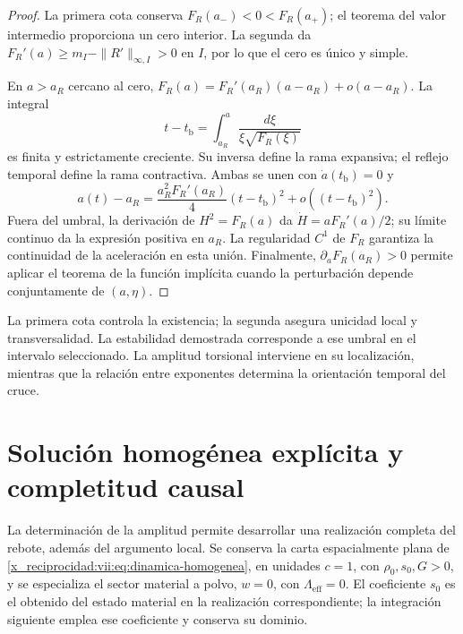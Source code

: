 \begin{proof}
La primera cota conserva
\(F_R(a_-)<0<F_R(a_+)\); el teorema del valor intermedio proporciona
un cero interior. La segunda da
\(F_R'(a)\geq m_I-\|R'\|_{\infty,I}>0\) en \(I\), por lo que el cero
es único y simple.

En \(a>a_R\) cercano al cero,
\(F_R(a)=F_R'(a_R)(a-a_R)+o(a-a_R)\).
La integral
\[
 t-t_{\mathrm b}=\int_{a_R}^{a}
          \frac{d\xi}{\xi\sqrt{F_R(\xi)}}
\]
es finita y estrictamente creciente. Su inversa define la rama
expansiva; el reflejo temporal define la rama contractiva.
Ambas se unen con \(\dot a(t_{\mathrm b})=0\) y
\[
 a(t)-a_R
 =\frac{a_R^2F_R'(a_R)}4(t-t_{\mathrm b})^2
   +o((t-t_{\mathrm b})^2).
\]
Fuera del umbral, la derivación de \(H^2=F_R(a)\) da
\(\dot H=aF_R'(a)/2\); su límite continuo da la expresión positiva
en \(a_R\). La regularidad \(C^1\) de \(F_R\) garantiza la continuidad
de la aceleración en esta unión. Finalmente,
\(\partial_aF_R(a_R)>0\) permite aplicar el teorema de la función
implícita cuando la perturbación depende conjuntamente de \((a,\eta)\).
\end{proof}

La primera cota controla la existencia; la segunda asegura unicidad
local y transversalidad. La estabilidad demostrada corresponde a
ese umbral en el intervalo seleccionado. La amplitud torsional
interviene en su localización, mientras que la relación entre
exponentes determina la orientación temporal del cruce.



\chapter{Solución homogénea explícita y completitud causal}
\label{x_reciprocidad:vii:sec:solucion-homogenea}
La determinación de la amplitud permite desarrollar una realización
completa del rebote, además del argumento local. Se conserva la carta
espacialmente plana de \eqref{x_reciprocidad:vii:eq:dinamica-homogenea}, en unidades
\(c=1\), con \(\rho_0,s_0,G>0\), y se especializa el sector material
a polvo, \(w=0\), con \(\Lambda_{\mathrm{eff}}=0\).
El coeficiente \(s_0\) es el obtenido del estado
material en la realización correspondiente; la integración siguiente
emplea ese coeficiente y conserva su dominio.

